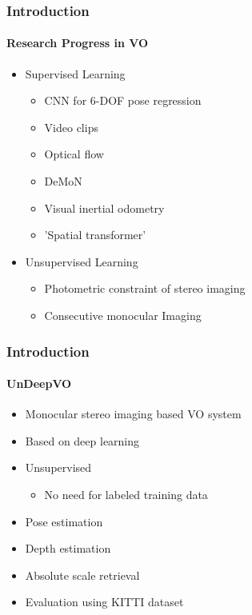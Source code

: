 \begin{frame}
    \frametitle{Introduction}
    \framesubtitle{Research Progress in VO}
    \begin{itemize}
    \item Supervised Learning
     \begin{itemize}
        \item CNN for 6-DOF pose regression
        \item Video clips
        \item Optical flow
        \item DeMoN
        \item Visual inertial odometry
        \item 'Spatial transformer'
        \end{itemize}
    \end{itemize}
    \begin{itemize} 
    \item Unsupervised Learning
     \begin{itemize}
        \item Photometric constraint of stereo imaging
        \item Consecutive monocular Imaging
        \end{itemize}
    \end{itemize}
\end{frame}

\begin{frame}
    \frametitle{Introduction}
    \framesubtitle{UnDeepVO}
    \begin{itemize}
        \item Monocular stereo imaging based VO system
        \item Based on deep learning
        \item Unsupervised
        \begin{itemize}
            \item No need for labeled training data
        \end{itemize}
        \item Pose estimation
        \item Depth estimation
        \item Absolute scale retrieval
        \item Evaluation using KITTI dataset
    \end{itemize}
\end{frame}
